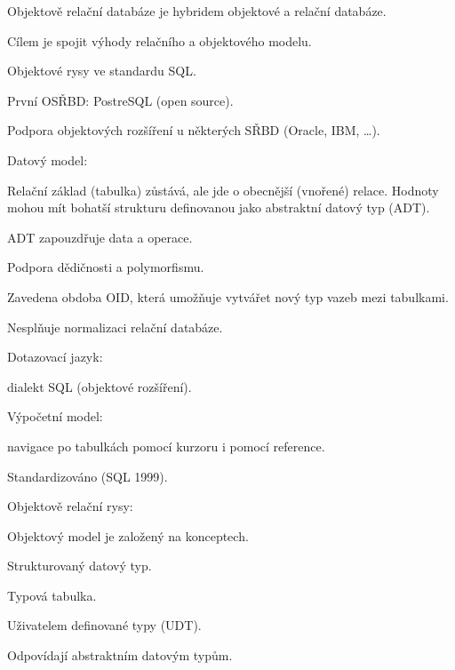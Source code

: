 \begin{compactitem}
    \item Objektově relační databáze je hybridem objektové a relační databáze. \begin{compactitem}
        \item Cílem je spojit výhody relačního a objektového modelu.
    \end{compactitem}

    \item Objektové rysy ve standardu SQL.
    \item První OSŘBD: PostreSQL (open source).
    \item Podpora objektových rozšíření u některých SŘBD (Oracle, IBM, \dots).

    \item Datový model: \begin{compactitem}
        \item Relační základ (tabulka) zůstává, ale jde o obecnější (vnořené) relace. Hodnoty mohou mít bohatší strukturu definovanou jako abstraktní datový typ (ADT).
        \item ADT zapouzdřuje data a operace.
        \item Podpora dědičnosti a polymorfismu.
        \item Zavedena obdoba OID, která umožňuje vytvářet nový typ vazeb mezi tabulkami.
        \item Nesplňuje normalizaci relační databáze.
    \end{compactitem}

    \item Dotazovací jazyk: \begin{compactitem}
        \item dialekt SQL (objektové rozšíření).
    \end{compactitem}

    \item Výpočetní model: \begin{compactitem}
        \item navigace po tabulkách pomocí kurzoru i pomocí reference.
    \end{compactitem}

    \item Standardizováno (SQL 1999).

    \item Objektově relační rysy: \begin{compactitem}
        \item Objektový model je založený na konceptech. \begin{compactitem}
            \item Strukturovaný datový typ.
            \item Typová tabulka.
        \end{compactitem}
        \item Uživatelem definované typy (UDT). \begin{compactitem}
            \item Odpovídají abstraktním datovým typům.
        \end{compactitem}
    \end{compactitem}
\end{compactitem}

